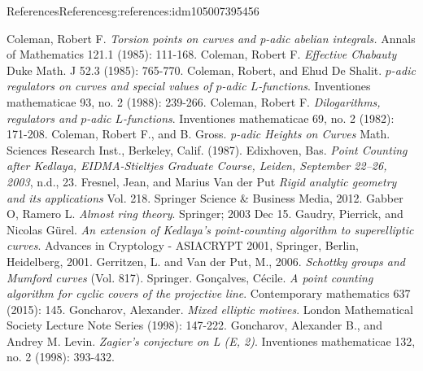 \documentclass[oneside,10pt,]{book}
\numberwithin{equation}{section}
\begin{document}
\begin{references-chapter-numberless}{References}{}{References}{}{}{g:references:idm105007395456}
\begin{thebibliography}{9}
\hypertarget{x:biblio:bib-coleman-torsion}{}Coleman, Robert F.  \textit{Torsion points on curves and p-adic abelian integrals.} Annals of Mathematics 121.1 (1985): 111-168.
\hypertarget{x:biblio:bib-coleman-chabauty}{}Coleman, Robert F.  \textit{Effective Chabauty} Duke Math. J 52.3 (1985): 765-770.
\hypertarget{x:biblio:bib-coleman-de-shalit}{}Coleman, Robert, and Ehud De Shalit. \textit{\(p\)-adic regulators on curves and special values of \(p\)-adic \(L\)-functions}. Inventiones mathematicae 93, no. 2 (1988): 239-266.
\hypertarget{x:biblio:bib-coleman-dilogs}{}Coleman, Robert F. \textit{Dilogarithms, regulators and \(p\)-adic \(L\)-functions}. Inventiones mathematicae 69, no. 2 (1982): 171-208.
\hypertarget{x:biblio:bib-coleman-gross}{}Coleman, Robert F., and B. Gross. \textit{p-adic Heights on Curves} Math. Sciences Research Inst., Berkeley, Calif. (1987).
\hypertarget{x:biblio:bib-edixhoven-after}{}Edixhoven, Bas. \textit{Point Counting after Kedlaya, EIDMA-Stieltjes Graduate Course, Leiden, September 22–26, 2003}, n.d., 23.
\hypertarget{x:biblio:bib-fresnel-van-der-put}{}Fresnel, Jean, and Marius Van der Put \textit{Rigid analytic geometry and its applications} Vol. 218. Springer Science \& Business Media, 2012.
\hypertarget{x:biblio:bib-gabber-ramero}{}Gabber O, Ramero L. \textit{Almost ring theory}. Springer; 2003 Dec 15.
\hypertarget{x:biblio:bib-gaudry-gurel}{}Gaudry, Pierrick, and Nicolas Gürel. \textit{An extension of Kedlaya's point-counting algorithm to superelliptic curves}. Advances in Cryptology - ASIACRYPT 2001, Springer, Berlin, Heidelberg, 2001.
\hypertarget{x:biblio:bib-gerritzen-van-der-put}{}Gerritzen, L. and Van der Put, M., 2006. \textit{Schottky groups and Mumford curves} (Vol. 817). Springer.
\hypertarget{x:biblio:bib-goncalves}{}Gonçalves, Cécile. \textit{A point counting algorithm for cyclic covers of the projective line}. Contemporary mathematics 637 (2015): 145.
\hypertarget{x:biblio:bib-goncharov-mixed}{}Goncharov, Alexander. \textit{Mixed elliptic motives}. London Mathematical Society Lecture Note Series (1998): 147-222.
\hypertarget{x:biblio:bib-gl}{}Goncharov, Alexander B., and Andrey M. Levin. \textit{Zagier's conjecture on L (E, 2)}. Inventiones mathematicae 132, no. 2 (1998): 393-432.

\end{thebibliography}
\end{references-chapter-numberless}
\end{document}
